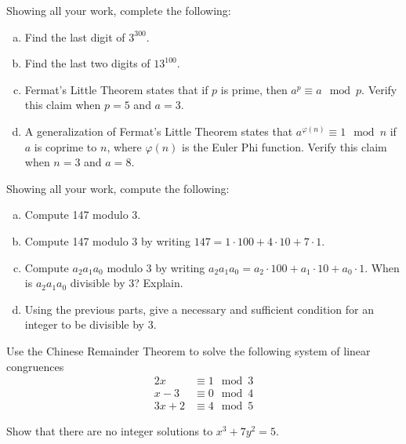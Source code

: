 \documentclass[11pt,letterpaper]{article}
\begin{document}

 Showing all your work, complete the following:
	\begin{enumerate}[(a)]
	\item Find the last digit of $3^{300}$.
	\item Find the last two digits of $13^{100}$.
	\item Fermat's Little Theorem states that if $p$ is prime, then $a^p \equiv a \mod p$. Verify this claim when $p= 5$ and $a= 3$. 
	\item A generalization of Fermat's Little Theorem states that $a^{\varphi(n)} \equiv 1 \mod n$ if $a$ is coprime to $n$, where $\varphi(n)$ is the Euler Phi function. Verify this claim when $n= 3$ and $a= 8$. 
	\end{enumerate}



\newpage



 Showing all your work, compute the following:
	\begin{enumerate}[(a)]
	\item Compute 147 modulo 3. 
	\item Compute 147 modulo 3 by writing $147= 1 \cdot 100 + 4 \cdot 10 + 7 \cdot 1$.
	\item Compute $a_2a_1a_0$ modulo 3 by writing $a_2a_1a_0= a_2 \cdot 100 + a_1 \cdot 10 + a_0 \cdot 1$. When is $a_2a_1a_0$ divisible by 3? Explain.
	\item Using the previous parts, give a necessary and sufficient condition for an integer to be divisible by 3. 
	\end{enumerate}



\newpage



 Use the Chinese Remainder Theorem to solve the following system of linear congruences
	\[
	\begin{aligned}
	2x &\equiv 1 \mod 3 \\
	x - 3&\equiv 0 \mod 4 \\
	3x + 2&\equiv 4 \mod 5
	\end{aligned}
	\]



\newpage



 Show that there are no integer solutions to $x^3 + 7y^2= 5$. 
\end{document}
